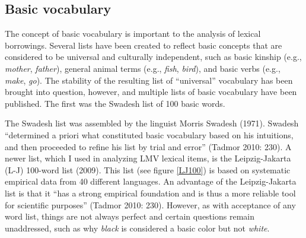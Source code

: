 \documentclass[output=paper]{LSP/langsci}
\begin{document}
\subsection{Basic vocabulary}

	The concept of basic vocabulary is important to the analysis of lexical borrowings. Several lists have been created to reflect basic concepts that are considered to be universal and culturally independent, such as basic kinship (e.g., \emph{mother}, \emph{father}), general animal terms (e.g., \emph{fish}, \emph{bird}), and basic verbs (e.g., \emph{make}, \emph{go}). The stability of the resulting list of “universal” vocabulary has been brought into question, however, and multiple lists of basic vocabulary have been published. The first was the Swadesh list of 100 basic words.

	The Swadesh list was assembled by the linguist Morris Swadesh (1971). Swadesh “determined a priori what constituted basic vocabulary based on his intuitions, and then proceeded to refine his list by trial and error” (Tadmor 2010: 230). A newer list, which I used in analyzing LMV lexical items, is the Leipzig-Jakarta (L-J) 100-word list (2009). This list (see figure \ref{LJ100}) is based on systematic empirical data from 40 different languages. An advantage of the Leipzig-Jakarta list is that it ``has a strong empirical foundation and is thus a more reliable tool for scientific purposes” (Tadmor 2010: 230). However, as with acceptance of any word list, things are not always perfect and certain questions remain unaddressed, such as why \emph{black} is considered a basic color but not \emph{white}.
\end{document}
